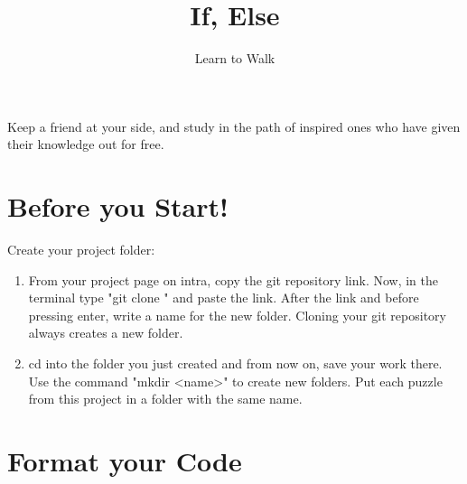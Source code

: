 \documentclass{42-en}
\begin{document}
\title{If, Else}
\subtitle{Learn to Walk}


\summary
{
	Keep a friend at your side, and study in the path of inspired ones who have given their knowledge out for free. 
}

\maketitle

\tableofcontents


\chapter{Before you Start!}

Create your project folder:
	\begin{enumerate}
		\item From your project page on intra, copy the git repository link. Now, in the terminal type "git clone " and paste the link. After the link and before pressing enter, write a name for the new folder. Cloning your git repository always creates a new folder.
		\item cd into the folder you just created and from now on, save your work there. Use the command "mkdir <name>" to create new folders. Put each puzzle from this project in a folder with the same name.
	\end{enumerate}



\chapter{Format your Code}
\end{document}
